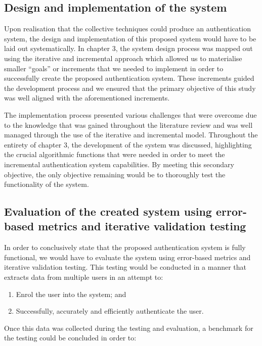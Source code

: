 \subsection{Design and implementation of the system}

Upon realisation that the collective techniques could produce an authentication system, the design and implementation of this proposed system would have to be laid out systematically. In chapter 3, the system design process was mapped out using the iterative and incremental approach which allowed us to materialise smaller “goals” or increments that we needed to implement in order to successfully create the proposed authentication system. These increments guided the development process and we ensured that the primary objective of this study was well aligned with the aforementioned increments. 

The implementation process presented various challenges that were overcome due to the knowledge that was gained throughout the literature review and was well managed through the use of the iterative and incremental model. Throughout the entirety of chapter 3, the development of the system was discussed, highlighting the crucial algorithmic functions that were needed in order to meet the incremental authentication system capabilities. By meeting this secondary objective, the only objective remaining would be to thoroughly test the functionality of the system.


\subsection{Evaluation of the created system using error-based metrics and iterative validation testing}

In order to conclusively state that the proposed authentication system is fully functional, we would have to evaluate the system using error-based metrics and iterative validation testing. This testing would be conducted in a manner that extracts data from multiple users in an attempt to:

\begin{enumerate}[label=\roman*.]
    \item Enrol the user into the system; and
    \item Successfully, accurately and efficiently authenticate the user.
\end{enumerate}

Once this data was collected during the testing and evaluation, a benchmark for the testing could be concluded in order to: 

